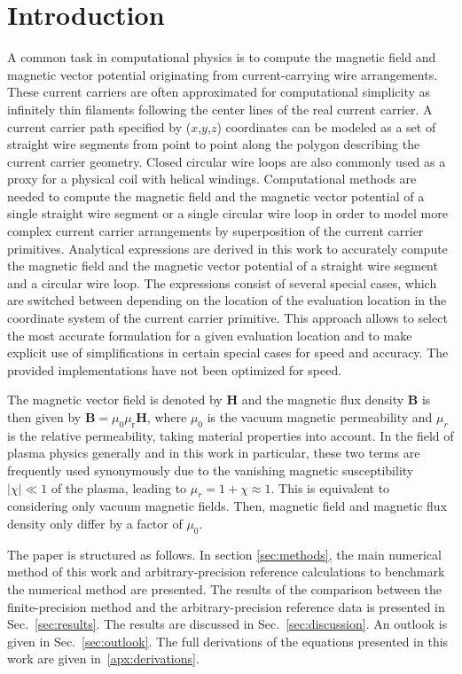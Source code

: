\section{Introduction}
\label{sec:introduction}
A common task in computational physics is to compute the magnetic field and magnetic vector potential
originating from current-carrying wire arrangements.
These current carriers are often approximated for computational simplicity as infinitely thin filaments
following the center lines of the real current carrier.
A current carrier path specified by ($x$,$y$,$z$) coordinates
can be modeled as a set of straight wire segments from point to point along the polygon describing the current carrier geometry.
Closed circular wire loops are also commonly used as a proxy for a physical coil with helical windings.
Computational methods are needed to compute the magnetic field and the magnetic vector potential
of a single straight wire segment or a single circular wire loop
in order to model more complex current carrier arrangements
by superposition of the current carrier primitives.
Analytical expressions are derived in this work to accurately compute
the magnetic field and the magnetic vector potential of a straight wire segment
and a circular wire loop. The expressions consist of several special cases,
which are switched between depending on the location of the evaluation location
in the coordinate system of the current carrier primitive.
This approach allows to select the most accurate formulation
for a given evaluation location and to make explicit use of simplifications
in certain special cases for speed and accuracy.
The provided implementations have not been optimized for speed.

The magnetic vector field is denoted by $\mathbf{H}$ and
the magnetic flux density $\mathbf{B}$ is then given by $\mathbf{B} = \mu_0 \mu_\mathrm{r} \mathbf{H}$,
where $\mu_0$ is the vacuum magnetic permeability
and $\mu_r$ is the relative permeability, taking material properties into account.
In the field of plasma physics generally and in this work in particular,
these two terms are frequently used synonymously
due to the vanishing magnetic susceptibility $|\chi| \ll 1$ of the plasma,
leading to $\mu_r = 1+\chi \approx 1$.
This is equivalent to considering only vacuum magnetic fields.
Then, magnetic field and magnetic flux density only differ by a factor of $\mu_0$.

The paper is structured as follows.
In section \ref{sec:methods}, the main numerical method of this work
and arbitrary-precision reference calculations to benchmark the numerical method are presented.
The results of the comparison between the finite-precision method
and the arbitrary-precision reference data is presented in Sec.~\ref{sec:results}.
The results are discussed in Sec.~\ref{sec:discussion}.
An outlook is given in Sec.~\ref{sec:outlook}.
The full derivations of the equations presented in this work are given in~\ref{apx:derivations}.
